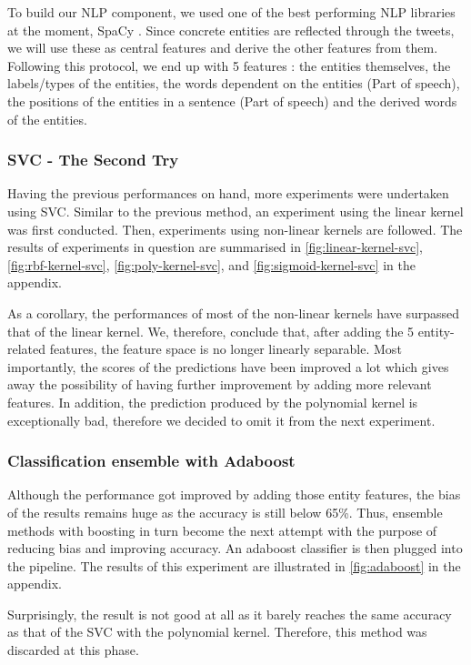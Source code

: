 To build our NLP component, we used one of the best performing NLP libraries at the moment, SpaCy \cite{x2,x3}. Since concrete entities are  reflected through the tweets, we will use these as central features and derive the other features from them. Following this protocol, we end up with 5 features : the entities themselves,  the labels/types of the entities, the words dependent on the entities (Part of speech), the positions of the entities in a sentence (Part of speech) and the derived words of the entities.

\subsubsection{SVC - The Second Try}
Having the previous performances on hand, more experiments were undertaken using SVC.
Similar to the previous method, an experiment using the linear kernel was first conducted.
Then, experiments using non-linear kernels are followed.
The results of experiments in question are summarised in \autoref{fig:linear-kernel-svc}, \autoref{fig:rbf-kernel-svc},
\autoref{fig:poly-kernel-svc}, and \autoref{fig:sigmoid-kernel-svc} in the appendix.


As a corollary, the performances of most of the non-linear kernels have surpassed that of the linear kernel.
We, therefore, conclude that, after adding the 5 entity-related features, the feature space is no longer linearly separable.
Most importantly, the scores of the predictions have been improved a lot which gives away the possibility of having further improvement by adding more relevant features.
In addition, the prediction produced by the polynomial kernel is exceptionally bad, therefore we decided to omit it from the next experiment.

\subsubsection{Classification ensemble with Adaboost}

Although the performance got improved by adding those entity features, the bias of the results remains huge as the accuracy is still below 65\%.
Thus, ensemble methods with boosting \cite{x4} in turn become the next attempt with the purpose of reducing bias and improving accuracy.
An adaboost classifier is then plugged into the pipeline.
The results of this experiment are illustrated in \autoref{fig:adaboost} in the appendix.

Surprisingly, the result is not good at all as it barely reaches the same accuracy as that of the SVC with the polynomial kernel.
Therefore, this method was discarded at this phase.

